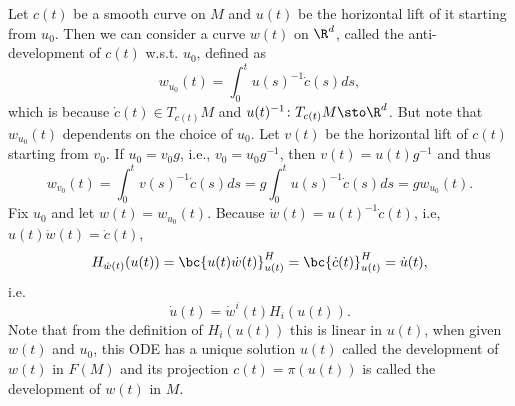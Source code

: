 Let $c(t)$ be a smooth curve on $M$ and $u(t)$ be the horizontal lift of it starting from $u_0$. Then we can consider a curve $w(t)$ on $\R^d$, called the anti-development of $c(t)$ w.s.t. $u_0$, defined as
\begin{equation*}
    w_{u_0}(t) = \int_0^t u(s)^{-1}\dot{c}(s)ds,
\end{equation*}
which is because $\dot{c}(t) \in T_{c(t)}M$ and $u(t)^{-1} \colon T_{c(t)}M \sto \R^d$. But note that $w_{u_0}(t)$ dependents on the choice of $u_0$. Let $v(t)$ be the horizontal lift of $c(t)$ starting from $v_0$. If $u_0 = v_0g$, i.e., $v_0 = u_0 g^{-1}$, then $v(t) = u(t)g^{-1}$ and thus
\begin{equation*}
    w_{v_0}(t) = \int_0^t v(s)^{-1}\dot{c}(s)ds = g\int_0^t u(s)^{-1}\dot{c}(s)ds = g w_{u_0}(t).
\end{equation*}
Fix $u_0$ and let $w(t) = w_{u_0}(t)$. Because $\dot{w}(t) = u(t)^{-1}\dot{c}(t)$, i.e, $u(t) \dot{w}(t) = \dot{c}(t)$,
\begin{equation*}
    H_{\dot{w}(t)}(u(t)) = \bc{u(t) \dot{w}(t)}^H_{u(t)} = \bc{\dot{c}(t)}^H_{u(t)} = \dot{u}(t),
\end{equation*}
i.e.
\begin{equation*}
    \dot{u}(t) = \dot{w}^i(t)H_i(u(t)).
\end{equation*}
Note that from the definition of $H_i(u(t))$ this is linear in $u(t)$, when given $w(t)$ and $u_0$, this ODE has a unique solution $u(t)$ called the development of $w(t)$ in $F(M)$ and its projection $c(t) = \pi(u(t))$ is called the development of $w(t)$ in $M$.

